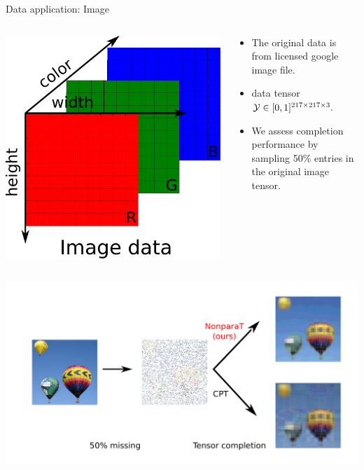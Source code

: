 \documentclass[10pt, mathserif]{beamer} %
\theoremstyle{definition}
\theoremstyle{plain}
\begin{document}
\begin{frame}{Data application: Image}
 \begin{columns}
\begin{column}{0.20\textwidth}
   \begin{center}
     \includegraphics[width=\textwidth]{Figures/imgdata.pdf}
     \end{center}
\end{column}
\begin{column}{0.7\textwidth} 
\begin{itemize}
    \item The original data is from licensed google image file.
    \item data tensor $\mathcal{Y}\in[0,1]^{217\times217\times3}.$ 
    \item We assess completion performance by sampling 50\% entries in the original image tensor.
\end{itemize}
\end{column}
\end{columns}


      \begin{center}
    \includegraphics[width =\textwidth]{Figures/imageresult.pdf}
    \end{center}
\end{frame}
\end{document}
